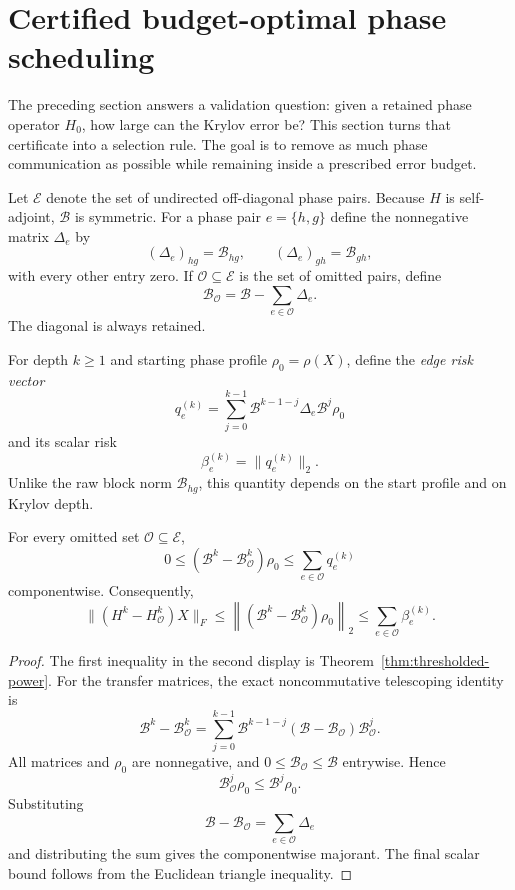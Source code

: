 \section{Certified budget-optimal phase scheduling}
\label{sec:budget-scheduler}

The preceding section answers a validation question: given a retained phase
operator $H_0$, how large can the Krylov error be?  This section turns that
certificate into a selection rule.  The goal is to remove as much phase
communication as possible while remaining inside a prescribed error budget.

Let $\mathcal E$ denote the set of undirected off-diagonal phase pairs.  Because
$H$ is self-adjoint, $\mathcal B$ is symmetric.  For a phase pair
$e=\{h,g\}$ define the nonnegative matrix $\Delta_e$ by
\[
(\Delta_e)_{hg}=\mathcal B_{hg},\qquad
(\Delta_e)_{gh}=\mathcal B_{gh},
\]
with every other entry zero.  If $\mathcal O\subseteq\mathcal E$ is the set
of omitted pairs, define
\[
\mathcal B_{\mathcal O}
=\mathcal B-\sum_{e\in\mathcal O}\Delta_e.
\]
The diagonal is always retained.

For depth $k\ge1$ and starting phase profile $\rho_0=\rho(X)$, define the
\emph{edge risk vector}
\[
\boxed{
q_e^{(k)}
=
\sum_{j=0}^{k-1}
\mathcal B^{k-1-j}\Delta_e\mathcal B^j\rho_0
}
\]
and its scalar risk
\[
\boxed{
\beta_e^{(k)}=\lVert q_e^{(k)}\rVert_2.
}
\]
Unlike the raw block norm $\mathcal B_{hg}$, this quantity depends on the
start profile and on Krylov depth.

\begin{theorem}
\label{thm:edge-additive-majorant}
For every omitted set $\mathcal O\subseteq\mathcal E$,
\[
\boxed{
0\le
(\mathcal B^k-\mathcal B_{\mathcal O}^k)\rho_0
\le
\sum_{e\in\mathcal O}q_e^{(k)}
}
\]
componentwise.  Consequently,
\[
\boxed{
\lVert(H^k-H_{\mathcal O}^k)X\rVert_F
\le
\left\lVert
(\mathcal B^k-\mathcal B_{\mathcal O}^k)\rho_0
\right\rVert_2
\le
\sum_{e\in\mathcal O}\beta_e^{(k)}.
}
\]
\end{theorem}

\begin{proof}
The first inequality in the second display is
Theorem~\ref{thm:thresholded-power}.  For the transfer matrices, the exact
noncommutative telescoping identity is
\[
\mathcal B^k-\mathcal B_{\mathcal O}^k
=
\sum_{j=0}^{k-1}
\mathcal B^{k-1-j}
(\mathcal B-\mathcal B_{\mathcal O})
\mathcal B_{\mathcal O}^j.
\]
All matrices and $\rho_0$ are nonnegative, and
$0\le\mathcal B_{\mathcal O}\le\mathcal B$ entrywise.  Hence
\[
\mathcal B_{\mathcal O}^j\rho_0
\le
\mathcal B^j\rho_0.
\]
Substituting
\[
\mathcal B-\mathcal B_{\mathcal O}
=
\sum_{e\in\mathcal O}\Delta_e
\]
and distributing the sum gives the componentwise majorant.  The final scalar
bound follows from the Euclidean triangle inequality.
\end{proof}

